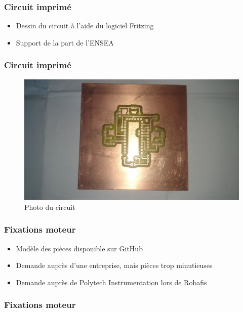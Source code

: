 \documentclass{beamer}
\begin{document}
{	\begin{frame}
	  \frametitle{Circuit imprimé}
	  
	  \begin{itemize}
	    \item Dessin du circuit à l'aide du logiciel Fritzing
	    \item Support de la part de l'ENSEA
	  \end{itemize}
	\end{frame}
	
	\begin{frame}
	  \frametitle{Circuit imprimé}
	
	  \begin{figure}[htbp]
	    \centering
	    \includegraphics[scale=0.05]{img/carte_avant.jpg}
	    \caption{Photo du circuit}
	  \end{figure} 
	\end{frame}
	
	\begin{frame}
	  \frametitle{Fixations moteur}
	  
	  \begin{itemize}
	    \item Modèle des pièces disponible sur GitHub
	    \item Demande auprès d'une entreprise, mais pièces trop minutieuses
	    \item Demande auprès de Polytech Instrumentation lors de Robafis
	  \end{itemize}
	\end{frame}

	\begin{frame}
	  \frametitle{Fixations moteur}
	

\end{frame}}
\end{document}
